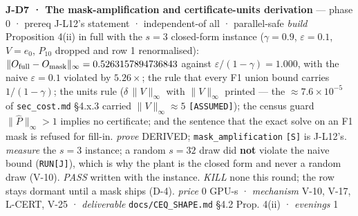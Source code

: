 \documentclass[11pt,a4paper]{article}
\newcounter{none}                 %
\theoremstyle{plain}
\theoremstyle{definition}
\theoremstyle{remark}
\begin{document}
\textbf{J-D7 · The mask-amplification and certificate-units derivation}
--- phase 0 · prereq J-L12's statement · independent-of all ·
parallel-safe \emph{build} Proposition 4(ii) in full with the \(s=3\)
closed-form instance (\(\gamma=0.9\), \(\varepsilon=0.1\), \(V=e_0\),
\(P_{10}\) dropped and row 1 renormalised):
\(\|O_{\rm full}-O_{\rm mask}\|_\infty=0.5263157894736843\) against
\(\varepsilon/(1-\gamma)=1.000\), with the naive \(\varepsilon=0.1\)
violated by \(5.26\times\); the rule that every F1 union bound carries
\(1/(1-\gamma)\); the units rule (\(\delta\,\|V\|_\infty\) with
\(\|V\|_\infty\) printed --- the \(\approx7.6\times10^{-5}\) of
\texttt{sec\_cost.md} §4.x.3 carried \(\|V\|_\infty\approx5\)
\texttt{{[}ASSUMED{]}}); the census guard \(\|\hat P\|_\infty>1\)
implies no certificate; and the sentence that the exact solve on an F1
mask is refused for fill-in. \emph{prove} DERIVED;
\texttt{mask\_amplification} \texttt{{[}S{]}} is J-L12's. \emph{measure}
the \(s=3\) instance; a random \(s=32\) draw did \textbf{not} violate
the naive bound (\texttt{RUN{[}J{]}}), which is why the plant is the
closed form and never a random draw (V-10). \emph{PASS} written with the
instance. \emph{KILL} none this round; the row stays dormant until a
mask ships (D-4). \emph{price} \(0\) GPU-s · \emph{mechanism} V-10,
V-17, L-CERT, V-25 · \emph{deliverable} \texttt{docs/CEQ\_SHAPE.md} §4.2
Prop. 4(ii) · \emph{evenings} 1
\end{document}
